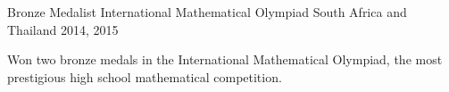 


\begin{cventries}


  \cventry
  {Bronze Medalist} %
  {International Mathematical Olympiad} %
  {South Africa and Thailand} %
  {2014, 2015} %
  { %
    \begin{cvitems}
    \item {Won two bronze medals in the International Mathematical Olympiad, the most prestigious high school mathematical competition.}
    \end{cvitems}
  }

\end{cventries}
